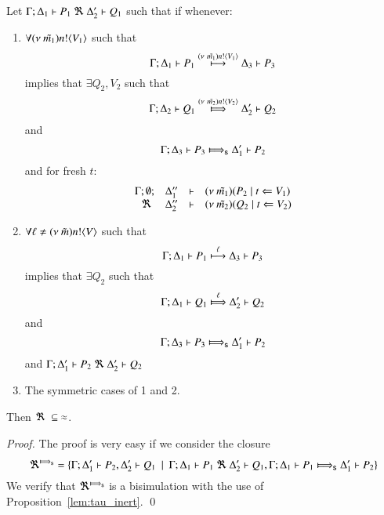 \begin{lemma}\rm
	\label{lem:up_to_session_transition}
	Let $\Gamma; \Delta_1 \vdash P_1 \ \Re\  \Delta_2' \vdash Q_1$ such
	that if whenever:
%
	\begin{enumerate}
		\item	$\forall (\nu\ \tilde{m_1}) n ! \langle V_1 \rangle$ such that
			\[
				\Gamma; \Delta_1 \vdash P_1 \stackrel{(\nu\ \tilde{m_1}) n ! \langle V_1 \rangle}{\longmapsto} \Delta_3 \vdash P_3
			\]
			implies that $\exists Q_2, V_2$ such that
			\[
				\horel{\Gamma}{\Delta_2}{Q_1}{\Hby{\news{\tilde{m_2}} \bactout{n}{V_2}}}{\Delta_2'}{Q_2}
			\]
			and
			\[
				\horel{\Gamma}{\Delta_3}{P_3}{\SHby{}}{\Delta_1'}{P_2}
			\]
			and for fresh $t$:
			\[
				\begin{array}{rcll} \Gamma; \emptyset; &\Delta_1''& \vdash& (\nu\ \tilde{m_1})(P_2 \;|\; t \Leftarrow V_1)\\ \ \Re\  &\Delta_2''& \vdash &  (\nu\ \tilde{m_2})(Q_2 \;|\; t \Leftarrow V_2) \end{array}
			\]
%
		\item	$\forall \ell \not= (\nu\ \tilde{m}) n ! \langle V \rangle$ such that
			\[
				\Gamma; \Delta_1 \vdash P_1 \stackrel{\ell}{\longmapsto} \Delta_3 \vdash P_3
			\]
			implies that $\exists Q_2$ such that 
			\[
				\horel{\Gamma}{\Delta_1}{Q_1}{\Hby{\ell}}{\Delta_2'}{Q_2}
			\]
			and
			\[
				\horel{\Gamma}{\Delta_3}{P_3}{\SHby{}}{\Delta_1'}{P_2}
			\]
			and
			$\Gamma; \Delta_1' \vdash P_2 \ \Re\  \Delta_2' \vdash Q_2$

		\item	The symmetric cases of 1 and 2.
	\end{enumerate}
	Then $\Re\ \subseteq\ \approx$.
\end{lemma}


\begin{proof}
	The proof is very easy if we consider the
	closure
	\[
		\Re^{\SHby{}} = \set{ \horel{\Gamma}{\Delta_1'}{P_2}{,}{\Delta_2'}{Q_1} \setbar \horel{\Gamma}{\Delta_1}{P_1}{\ \Re\ }{\Delta_2'}{Q_1},
		\horel{\Gamma}{\Delta_1}{P_1}{\SHby{}}{\Delta_1'}{P_2} }
	\]
	We verify that $\Re^{\SHby{}}$ is a bisimulation with
	the use of Proposition~\ref{lem:tau_inert}.
	\qed
\end{proof}
